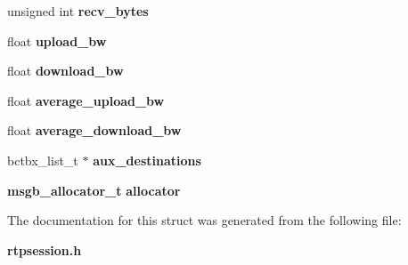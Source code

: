 \begin{DoxyCompactItemize}
unsigned int {\bfseries recv\+\_\+bytes}
\item 
\mbox{\label{struct__OrtpStream_a32002aca4eb936d0e0eae7db0527a114}} 
float {\bfseries upload\+\_\+bw}
\item 
\mbox{\label{struct__OrtpStream_ae45195d80f5e7454525f1f199f567352}} 
float {\bfseries download\+\_\+bw}
\item 
\mbox{\label{struct__OrtpStream_a4fc63feab16868e981d0b1a6c504bc5d}} 
float {\bfseries average\+\_\+upload\+\_\+bw}
\item 
\mbox{\label{struct__OrtpStream_aa2e99a8b88ccd92b21321e30a82821dd}} 
float {\bfseries average\+\_\+download\+\_\+bw}
\item 
\mbox{\label{struct__OrtpStream_a39ffbfb0da4d22c82705413e954bda64}} 
bctbx\+\_\+list\+\_\+t $\ast$ {\bfseries aux\+\_\+destinations}
\item 
\mbox{\label{struct__OrtpStream_a08a4b69497e4d4853802f7a799afc14f}} 
\textbf{ msgb\+\_\+allocator\+\_\+t} {\bfseries allocator}
\end{DoxyCompactItemize}


The documentation for this struct was generated from the following file\+:\begin{DoxyCompactItemize}
\item 
\textbf{ rtpsession.\+h}\end{DoxyCompactItemize}
